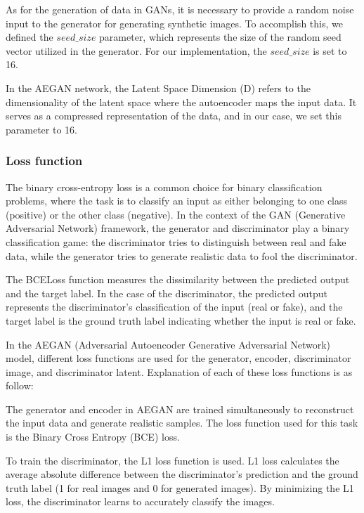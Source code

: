 \documentclass[letterpaper]{article} %
\begin{document}
As for the generation of data in GANs, it is necessary to provide a random noise input to the generator for generating synthetic images. To accomplish this, we defined the $seed\_size$ parameter, which represents the size of the random seed vector utilized in the generator. For our implementation, the $seed\_size$ is set to 16.

In the AEGAN network, the Latent Space Dimension (D) refers to the dimensionality of the latent space where the autoencoder maps the input data. It serves as a compressed representation of the data, and in our case, we set this parameter to 16.



\subsubsection{Loss function}
 The binary cross-entropy loss is a common choice for binary classification problems, where the task is to classify an input as either belonging to one class (positive) or the other class (negative). In the context of the GAN (Generative Adversarial Network) framework, the generator and discriminator play a binary classification game: the discriminator tries to distinguish between real and fake data, while the generator tries to generate realistic data to fool the discriminator.

 The BCELoss function measures the dissimilarity between the predicted output and the target label. In the case of the discriminator, the predicted output represents the discriminator's classification of the input (real or fake), and the target label is the ground truth label indicating whether the input is real or fake.

In the AEGAN (Adversarial Autoencoder Generative Adversarial Network) model, different loss functions are used for the generator, encoder, discriminator image, and discriminator latent. Explanation of each of these loss functions is as follow:

The generator and encoder in AEGAN are trained simultaneously to reconstruct the input data and generate realistic samples. The loss function used for this task is the Binary Cross Entropy (BCE) loss.

 To train the discriminator, the L1 loss function is used. L1 loss calculates the average absolute difference between the discriminator's prediction and the ground truth label (1 for real images and 0 for generated images). By minimizing the L1 loss, the discriminator learns to accurately classify the images.
\end{document}
